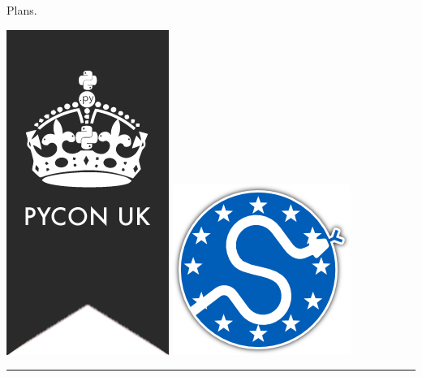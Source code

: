 \documentclass{beamer}
\begin{document}
\begin{frame}{Plans.}
    \begin{center}

        \includegraphics[height=0.2\textheight]{static/pyconuk.png}
        \hspace{3cm}
        \includegraphics[height=0.2\textheight]{static/euroscipy.png}
        
        \rule{\textwidth}{2pt}
        \vspace{5pt}


\end{center}
\end{frame}
\end{document}
